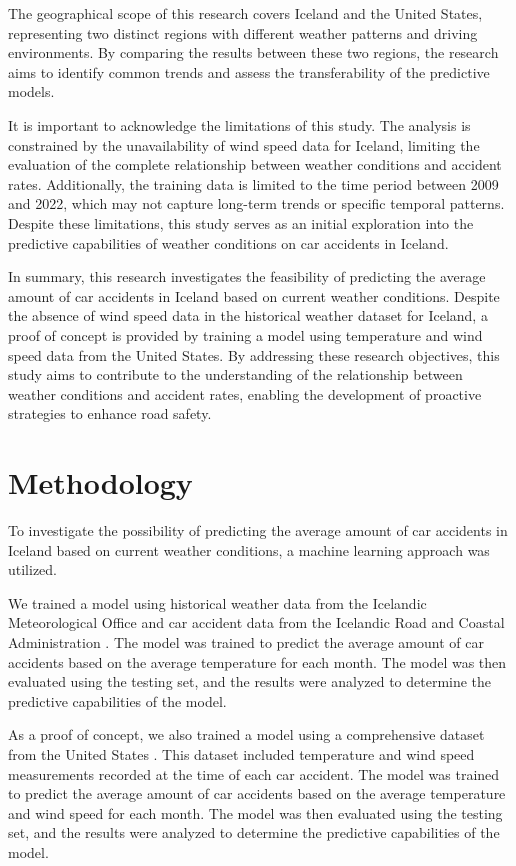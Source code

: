 \documentclass{article}
\begin{document}
The geographical scope of this research covers Iceland and the United States, representing two distinct regions with different weather patterns and driving environments. By comparing the results between these two regions, the research aims to identify common trends and assess the transferability of the predictive models.

It is important to acknowledge the limitations of this study. The analysis is constrained by the unavailability of wind speed data for Iceland, limiting the evaluation of the complete relationship between weather conditions and accident rates. Additionally, the training data is limited to the time period between 2009 and 2022, which may not capture long-term trends or specific temporal patterns. Despite these limitations, this study serves as an initial exploration into the predictive capabilities of weather conditions on car accidents in Iceland.

In summary, this research investigates the feasibility of predicting the average amount of car accidents in Iceland based on current weather conditions. Despite the absence of wind speed data in the historical weather dataset for Iceland, a proof of concept is provided by training a model using temperature and wind speed data from the United States. By addressing these research objectives, this study aims to contribute to the understanding of the relationship between weather conditions and accident rates, enabling the development of proactive strategies to enhance road safety.

\newpage
\section{Methodology}

To investigate the possibility of predicting the average amount of car accidents in Iceland based on current weather conditions, a machine learning approach was utilized.

We trained a model using historical weather data from the Icelandic Meteorological Office \cite{isl_weather_data} and car accident data from the Icelandic Road and Coastal Administration \cite{isl_accident_data}. The model was trained to predict the average amount of car accidents based on the average temperature for each month. The model was then evaluated using the testing set, and the results were analyzed to determine the predictive capabilities of the model.

As a proof of concept, we also trained a model using a comprehensive dataset from the United States \cite{usa_data}. This dataset included temperature and wind speed measurements recorded at the time of each car accident. The model was trained to predict the average amount of car accidents based on the average temperature and wind speed for each month. The model was then evaluated using the testing set, and the results were analyzed to determine the predictive capabilities of the model.
\end{document}
